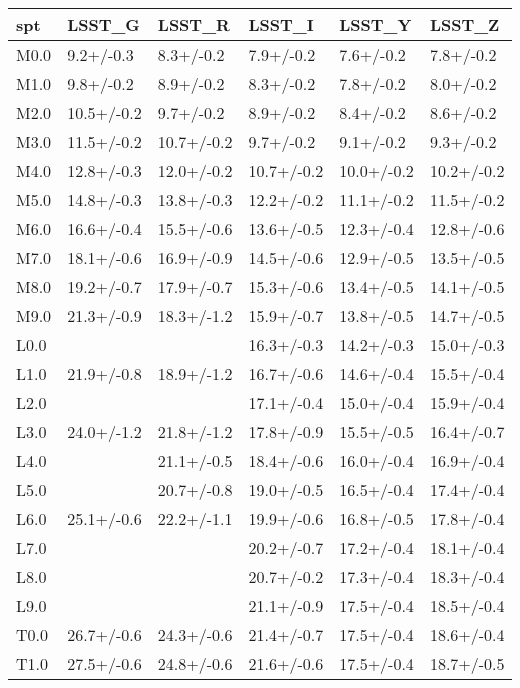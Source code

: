 \begin{tabular}{llllll}
\toprule
 spt &     LSST\_G &     LSST\_R &     LSST\_I &     LSST\_Y &     LSST\_Z \\
\midrule
M0.0 &  9.2+/-0.3 &  8.3+/-0.2 &  7.9+/-0.2 &  7.6+/-0.2 &  7.8+/-0.2 \\
M1.0 &  9.8+/-0.2 &  8.9+/-0.2 &  8.3+/-0.2 &  7.8+/-0.2 &  8.0+/-0.2 \\
M2.0 & 10.5+/-0.2 &  9.7+/-0.2 &  8.9+/-0.2 &  8.4+/-0.2 &  8.6+/-0.2 \\
M3.0 & 11.5+/-0.2 & 10.7+/-0.2 &  9.7+/-0.2 &  9.1+/-0.2 &  9.3+/-0.2 \\
M4.0 & 12.8+/-0.3 & 12.0+/-0.2 & 10.7+/-0.2 & 10.0+/-0.2 & 10.2+/-0.2 \\
M5.0 & 14.8+/-0.3 & 13.8+/-0.3 & 12.2+/-0.2 & 11.1+/-0.2 & 11.5+/-0.2 \\
M6.0 & 16.6+/-0.4 & 15.5+/-0.6 & 13.6+/-0.5 & 12.3+/-0.4 & 12.8+/-0.6 \\
M7.0 & 18.1+/-0.6 & 16.9+/-0.9 & 14.5+/-0.6 & 12.9+/-0.5 & 13.5+/-0.5 \\
M8.0 & 19.2+/-0.7 & 17.9+/-0.7 & 15.3+/-0.6 & 13.4+/-0.5 & 14.1+/-0.5 \\
M9.0 & 21.3+/-0.9 & 18.3+/-1.2 & 15.9+/-0.7 & 13.8+/-0.5 & 14.7+/-0.5 \\
L0.0 &            &            & 16.3+/-0.3 & 14.2+/-0.3 & 15.0+/-0.3 \\
L1.0 & 21.9+/-0.8 & 18.9+/-1.2 & 16.7+/-0.6 & 14.6+/-0.4 & 15.5+/-0.4 \\
L2.0 &            &            & 17.1+/-0.4 & 15.0+/-0.4 & 15.9+/-0.4 \\
L3.0 & 24.0+/-1.2 & 21.8+/-1.2 & 17.8+/-0.9 & 15.5+/-0.5 & 16.4+/-0.7 \\
L4.0 &            & 21.1+/-0.5 & 18.4+/-0.6 & 16.0+/-0.4 & 16.9+/-0.4 \\
L5.0 &            & 20.7+/-0.8 & 19.0+/-0.5 & 16.5+/-0.4 & 17.4+/-0.4 \\
L6.0 & 25.1+/-0.6 & 22.2+/-1.1 & 19.9+/-0.6 & 16.8+/-0.5 & 17.8+/-0.4 \\
L7.0 &            &            & 20.2+/-0.7 & 17.2+/-0.4 & 18.1+/-0.4 \\
L8.0 &            &            & 20.7+/-0.2 & 17.3+/-0.4 & 18.3+/-0.4 \\
L9.0 &            &            & 21.1+/-0.9 & 17.5+/-0.4 & 18.5+/-0.4 \\
T0.0 & 26.7+/-0.6 & 24.3+/-0.6 & 21.4+/-0.7 & 17.5+/-0.4 & 18.6+/-0.4 \\
T1.0 & 27.5+/-0.6 & 24.8+/-0.6 & 21.6+/-0.6 & 17.5+/-0.4 & 18.7+/-0.5 \\

\end{tabular}

